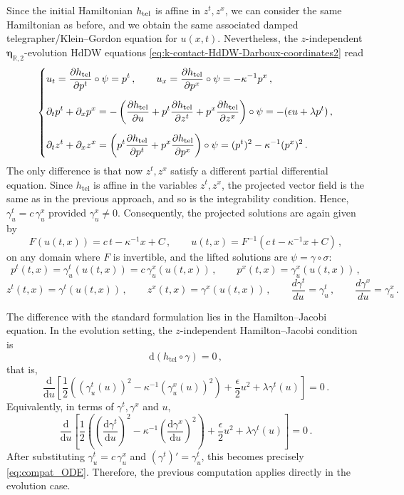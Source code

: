 \documentclass[11pt,twoside]{article}
\theoremstyle{plain}
\theoremstyle{definition}
\theoremstyle{remark}
\newcommand{\dd}{\mathrm{d}}
\renewcommand{\d}{\mathrm{d}}
\begin{document}
Since the initial Hamiltonian $h_{\rm tel}$ is affine in $z^t,z^x$, we can consider the same Hamiltonian as before, and we obtain the same associated damped telegrapher/Klein--Gordon equation for \(u(x,t)\). Nevertheless, the \(z\)-independent $\bm\eta_{\mathbb{R},2}$-evolution HdDW equations \eqref{eq:k-contact-HdDW-Darboux-coordinates2} read
\begin{equation}\label{eq:evolHdDW_telKG}
\begin{dcases}
u_t=\frac{\partial h_{\mathrm{tel}}}{\partial p^t}\circ\psi=p^t\,,
\qquad
u_x=\frac{\partial h_{\mathrm{tel}}}{\partial p^x}\circ\psi=-\kappa^{-1}p^x\,,\\[2mm]
\partial_t p^t+\partial_x p^x
=
-\left(\frac{\partial h_{\mathrm{tel}}}{\partial u}
+p^t\frac{\partial h_{\mathrm{tel}}}{\partial z^t}
+p^x\frac{\partial h_{\mathrm{tel}}}{\partial z^x}\right)\circ\psi
=-(\epsilon u+\lambda p^t)\,,\\[2mm]
\partial_t z^t+\partial_x z^x
=
\left(p^t\frac{\partial h_{\mathrm{tel}}}{\partial p^t}
+p^x\frac{\partial h_{\mathrm{tel}}}{\partial p^x}\right)\circ\psi
=(p^t)^2-\kappa^{-1}(p^x)^2\,.
\end{dcases}
\end{equation}
The only difference is that now \(z^t,z^x\) satisfy a different partial differential equation. Since \(h_{\mathrm{tel}}\) is affine in the variables \(z^t,z^x\), the projected vector field is the same as in the previous approach, and so is the integrability condition. Hence,
\(
\gamma_u^t=c\,\gamma_u^x
\)  
provided \(\gamma_u^x\neq0\). Consequently, the projected solutions are again given by
\[
F(u(t,x))=c\,t-\kappa^{-1}x+C\,,
\qquad
u(t,x)=F^{-1}(c\,t-\kappa^{-1}x+C)\,,
\]
on any domain where \(F\) is invertible, and the lifted solutions are \(\psi=\gamma\circ\sigma\):
\[
p^t(t,x)=\gamma_u^t(u(t,x))=c\,\gamma_u^x(u(t,x))\,,\qquad
p^x(t,x)=\gamma_u^x(u(t,x))\,,
\]
\[
z^t(t,x)=\gamma^t(u(t,x))\,,\qquad z^x(t,x)=\gamma^x(u(t,x))\,,
\qquad \frac{d\gamma^t}{du}=\gamma_u^t\,,\qquad \frac{d\gamma^x}{du}=\gamma_u^x\,.
\]

The difference with the standard formulation lies in the Hamilton--Jacobi equation. In the evolution setting, the \(z\)-independent Hamilton--Jacobi condition is
\[
\dd(h_{\mathrm{tel}}\circ\gamma)=0\,,
\]
that is,
\[
\frac{\dd}{\dd u}\left[
\frac12\left((\gamma_u^t(u))^2-\kappa^{-1}(\gamma_u^x(u))^2\right)
+\frac{\epsilon}{2}u^2+\lambda \gamma^t(u)
\right]=0\,.
\]
Equivalently, in terms of $\gamma^t,\gamma^x$ and $u$,
\[
\frac{\dd}{\dd u}\left[
\frac12\left(\left(\frac{\d\gamma^t}{\d u}\right)^2-\kappa^{-1}\left(\frac{\d\gamma^x}{\d u}\right)^2\right)
+\frac{\epsilon}{2}u^2+\lambda \gamma^t(u)
\right]=0\,.
\]
After substituting \(\gamma_u^t=c\,\gamma_u^x\) and \((\gamma^t)'=\gamma_u^t\), this becomes precisely \eqref{eq:compat_ODE}. Therefore, the previous computation applies directly in the evolution case.
\end{document}
